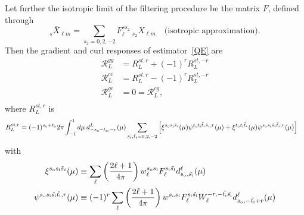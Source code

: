 \documentclass{article}
\newcommand{\si}[0]{{s_{\rm i}}}
\newcommand{\ti}[0]{{t_{\rm i}}}
\newcommand{\so}[0]{{s_{\rm o}}}
\renewcommand{\to}[0]{{t_{\rm o}}}
\newcommand{\resp}{ {\mathcal R} }
\begin{document}
Let further the isotropic limit of the filtering procedure be the matrix $F$, defined through
\begin{equation}
	_{s}\bar X_{\ell m} = \sum_{s_2 = 0,2,-2}F_\ell^{s s_2} \:_{s_2}X_{\ell m} \quad \textrm{(isotropic approximation)}.
\end{equation} 
Then the gradient and curl responses of estimator~\eqref{QE} are
\begin{equation}\boxed{
	\begin{split}
		\resp^{gg}_L &= R_L^{st, r} + (-1)^r R_L^{st, -r}\\
		\resp^{cc}_L &= R_L^{st, r} - (-1)^r R_L^{st, -r} \\
		\resp^{gc}_L &= 0 = \resp^{cg}_L, \\
	\end{split}}
\end{equation}
where $R_L^{st, r}$ is
\begin{equation}
\begin{split}
R_L^{st, r} &= (-1)^{\so + \to }2\pi  \int_{-1}^1 d \mu\: d^L_{-\so - \to, -r}(\mu)\sum_{\tilde s_i,\tilde t_i = 0,2,-2}  \left[\xi^{\so \si \tilde s_i} (\mu)\psi^{\to \ti \tilde t_i \tilde s_i, r }(\mu) +  \xi^{\to \ti \tilde t_i}(\mu) \psi^{\so \si \tilde s_i \tilde t_i, r }(\mu) \right]
\end{split}
\end{equation}
with
\begin{equation}
\begin{split}
\xi^{\so\si \tilde s_i}(\mu) &\equiv  \sum_\ell \left(\frac{2\ell + 1}{4\pi}\right)w^{\so\si}_\ell F_\ell^{\si \tilde \si} d^\ell_{\so,\tilde \si}(\mu) \\
\psi^{\so\si \tilde \si \tilde \ti, r}(\mu) &\equiv  (-1)^r \sum_\ell \left(\frac{2\ell + 1}{4\pi}\right)w^{\so \si}F^{\si \tilde \si}_\ell W_\ell^{-r, -\tilde \ti \tilde \si} d^\ell_{\so,-\tilde \ti + r}(\mu) 
\end{split}
\end{equation}
\end{document}
